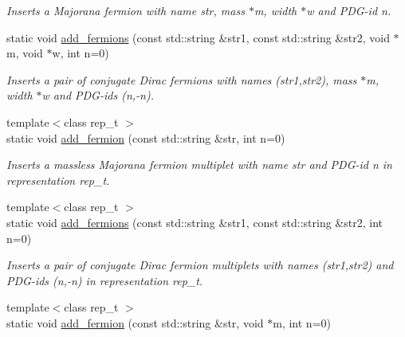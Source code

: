 \begin{DoxyCompactItemize}
\begin{DoxyCompactList}\small\item\em Inserts a Majorana fermion with name str, mass $\ast$m, width $\ast$w and P\-D\-G-\/id n. \end{DoxyCompactList}\item 
\hypertarget{a00370_a46eb14a53499f20bfbea625b01bbde92}{static void \hyperlink{a00370_a46eb14a53499f20bfbea625b01bbde92}{add\-\_\-fermions} (const std\-::string \&str1, const std\-::string \&str2, void $\ast$m, void $\ast$w, int n=0)}\label{a00370_a46eb14a53499f20bfbea625b01bbde92}

\begin{DoxyCompactList}\small\item\em Inserts a pair of conjugate Dirac fermions with names (str1,str2), mass $\ast$m, width $\ast$w and P\-D\-G-\/ids (n,-\/n). \end{DoxyCompactList}\item 
\hypertarget{a00370_a35659103225313895bab57fd0a1a5c89}{{\footnotesize template$<$class rep\-\_\-t $>$ }\\static void \hyperlink{a00370_a35659103225313895bab57fd0a1a5c89}{add\-\_\-fermion} (const std\-::string \&str, int n=0)}\label{a00370_a35659103225313895bab57fd0a1a5c89}

\begin{DoxyCompactList}\small\item\em Inserts a massless Majorana fermion multiplet with name str and P\-D\-G-\/id n in representation rep\-\_\-t. \end{DoxyCompactList}\item 
\hypertarget{a00370_ab3c53963beb700633bed6da348a4bbde}{{\footnotesize template$<$class rep\-\_\-t $>$ }\\static void \hyperlink{a00370_ab3c53963beb700633bed6da348a4bbde}{add\-\_\-fermions} (const std\-::string \&str1, const std\-::string \&str2, int n=0)}\label{a00370_ab3c53963beb700633bed6da348a4bbde}

\begin{DoxyCompactList}\small\item\em Inserts a pair of conjugate Dirac fermion multiplets with names (str1,str2) and P\-D\-G-\/ids (n,-\/n) in representation rep\-\_\-t. \end{DoxyCompactList}\item 
\hypertarget{a00370_a8802b9975deec1990fdc52555484f001}{{\footnotesize template$<$class rep\-\_\-t $>$ }\\static void \hyperlink{a00370_a8802b9975deec1990fdc52555484f001}{add\-\_\-fermion} (const std\-::string \&str, void $\ast$m, int n=0)}\label{a00370_a8802b9975deec1990fdc52555484f001}


\end{DoxyCompactItemize}
